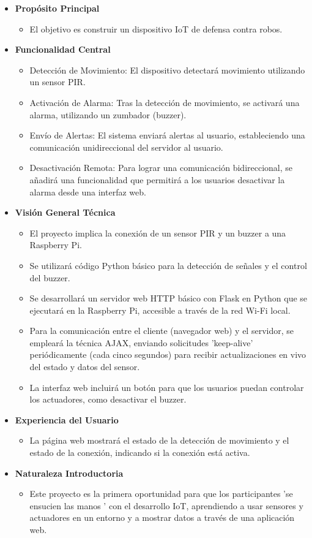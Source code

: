 \documentclass{report}
\begin{document}
\begin{itemize}
    \item \textbf{Propósito Principal}
    \begin{itemize}
        \item El objetivo es construir un dispositivo IoT de defensa contra robos.
    \end{itemize}
    \item \textbf{Funcionalidad Central}
    \begin{itemize}
        \item Detección de Movimiento: El dispositivo detectará movimiento utilizando un sensor PIR.
        \item Activación de Alarma: Tras la detección de movimiento, se activará una alarma, utilizando un zumbador (buzzer).
        \item Envío de Alertas: El sistema enviará alertas al usuario, estableciendo una comunicación unidireccional del servidor al usuario.
        \item Desactivación Remota: Para lograr una comunicación bidireccional, se añadirá una funcionalidad que permitirá a los usuarios desactivar la alarma 
        desde una interfaz web.
    \end{itemize}
    \item \textbf{Visión General Técnica}
    \begin{itemize}
        \item El proyecto implica la conexión de un sensor PIR y un buzzer a una Raspberry Pi.
        \item Se utilizará código Python básico para la detección de señales y el control del buzzer.
        \item Se desarrollará un servidor web HTTP básico con Flask en Python que se ejecutará en la Raspberry Pi, accesible a través de la red Wi-Fi local.
        \item Para la comunicación entre el cliente (navegador web) y el servidor, se empleará la técnica AJAX, enviando solicitudes  'keep-alive' 
        periódicamente (cada cinco segundos) para recibir actualizaciones en vivo del estado y datos del sensor.
        \item La interfaz web incluirá un botón para que los usuarios puedan controlar los actuadores, como desactivar el buzzer.
    \end{itemize}
    \item \textbf{Experiencia del Usuario}
    \begin{itemize}
        \item La página web mostrará el estado de la detección de movimiento y el estado de la conexión, indicando si la conexión está activa.
    \end{itemize}
        \item \textbf{Naturaleza Introductoria}
    \begin{itemize}
        \item Este proyecto es la primera oportunidad para que los participantes  'se ensucien las manos ' con el desarrollo IoT, aprendiendo a usar sensores y 
        actuadores en un entorno y a mostrar datos a través de una aplicación web.
    \end{itemize}
\end{itemize}
\end{document}

